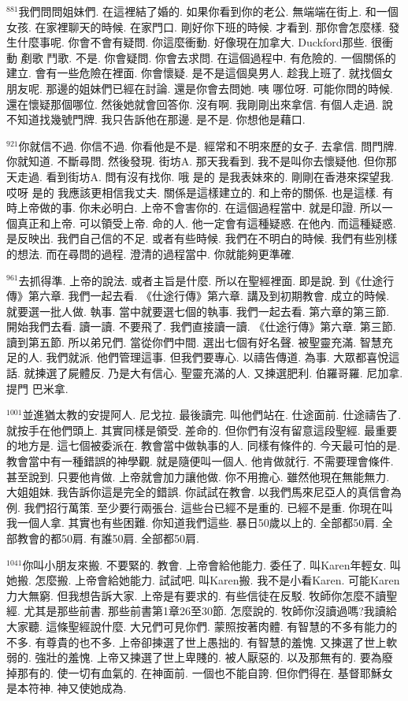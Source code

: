\documentclass{book}
\begin{document}
$^{881}$我們問問姐妹們.
在這裡結了婚的.
如果你看到你的老公.
無端端在街上.
和一個女孩.
在家裡聊天的時候.
在家門口.
剛好你下班的時候.
才看到.
那你會怎麼樣.
發生什麼事呢.
你會不會有疑問.
你這麼衝動.
好像現在加拿大.
Duckford那些.
很衝動 剷歌 鬥歌.
不是.
你會疑問.
你會去求問.
在這個過程中.
有危險的.
一個關係的建立.
會有一些危險在裡面.
你會懷疑.
是不是這個臭男人.
趁我上班了.
就找個女朋友呢.
那邊的姐妹們已經在討論.
還是你會去問她.
咦 哪位呀.
可能你問的時候.
還在懷疑那個哪位.
然後她就會回答你.
沒有啊.
我剛剛出來拿信.
有個人走過.
說不知道找幾號門牌.
我只告訴他在那邊.
是不是.
你想他是藉口.

$^{921}$你就信不過.
你信不過.
你看他是不是.
經常和不明來歷的女子.
去拿信.
問門牌.
你就知道.
不斷尋問.
然後發現.
街坊A.
那天我看到.
我不是叫你去懷疑他.
但你那天走過.
看到街坊A.
問有沒有找你.
哦 是的 是我表妹來的.
剛剛在香港來探望我.
哎呀 是的 我應該更相信我丈夫.
關係是這樣建立的.
和上帝的關係.
也是這樣.
有時上帝做的事.
你未必明白.
上帝不會害你的.
在這個過程當中.
就是印證.
所以一個真正和上帝.
可以領受上帝.
命的人.
他一定會有這種疑惑.
在他內.
而這種疑惑.
是反映出.
我們自己信的不足.
或者有些時候.
我們在不明白的時候.
我們有些別樣的想法.
而在尋問的過程.
澄清的過程當中.
你就能夠更準確.

$^{961}$去抓得準.
上帝的說法.
或者主旨是什麼.
所以在聖經裡面.
即是說.
到《仕途行傳》第六章.
我們一起去看.
《仕途行傳》第六章.
講及到初期教會.
成立的時候.
就要選一批人做.
執事.
當中就要選七個的執事.
我們一起去看.
第六章的第三節.
開始我們去看.
讀一讀.
不要飛了.
我們直接讀一讀.
《仕途行傳》第六章.
第三節.
讀到第五節.
所以弟兄們.
當從你們中間.
選出七個有好名聲.
被聖靈充滿.
智慧充足的人.
我們就派.
他們管理這事.
但我們要專心.
以禱告傳道.
為事.
大眾都喜悅這話.
就揀選了屍體反.
乃是大有信心.
聖靈充滿的人.
又揀選肥利.
伯羅哥羅.
尼加拿.
提門 巴米拿.

$^{1001}$並進猶太教的安提阿人.
尼戈拉.
最後讀完.
叫他們站在.
仕途面前.
仕途禱告了.
就按手在他們頭上.
其實同樣是領受.
差命的.
但你們有沒有留意這段聖經.
最重要的地方是.
這七個被委派在.
教會當中做執事的人.
同樣有條件的.
今天最可怕的是.
教會當中有一種錯誤的神學觀.
就是隨便叫一個人.
他肯做就行.
不需要理會條件.
甚至說到.
只要他肯做.
上帝就會加力讓他做.
你不用擔心.
雖然他現在無能無力.
大姐姐妹.
我告訴你這是完全的錯誤.
你試試在教會.
以我們馬來尼亞人的真信會為例.
我們招行萬策.
至少要行兩張台.
這些台已經不是重的.
已經不是重.
你現在叫我一個人拿.
其實也有些困難.
你知道我們這些.
暴日50歲以上的.
全部都50肩.
全部教會的都50肩.
有誰50肩.
全部都50肩.

$^{1041}$你叫小朋友來搬.
不要緊的.
教會.
上帝會給他能力.
委任了.
叫Karen年輕女.
叫她搬.
怎麼搬.
上帝會給她能力.
試試吧.
叫Karen搬.
我不是小看Karen.
可能Karen力大無窮.
但我想告訴大家.
上帝是有要求的.
有些信徒在反駁.
牧師你怎麼不讀聖經.
尤其是那些前書.
那些前書第1章26至30節.
怎麼說的.
牧師你沒讀過嗎?我讀給大家聽.
這條聖經說什麼.
大兄們可見你們.
蒙照按著肉體.
有智慧的不多有能力的不多.
有尊貴的也不多.
上帝卻揀選了世上愚拙的.
有智慧的羞愧.
又揀選了世上軟弱的.
強壯的羞愧.
上帝又揀選了世上卑賤的.
被人厭惡的.
以及那無有的.
要為廢掉那有的.
使一切有血氣的.
在神面前.
一個也不能自誇.
但你們得在.
基督耶穌女是本符神.
神又使她成為.
\end{document}
